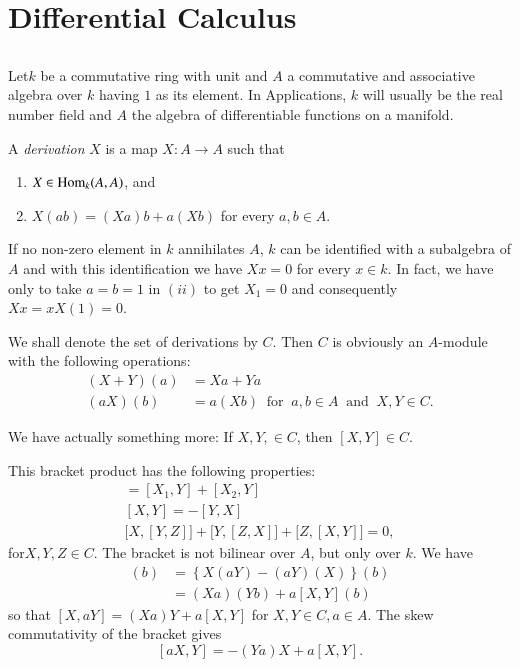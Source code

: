 \chapter{Differential Calculus}\label{chap1}

\section{}\label{chap1:sec1}%

Let\pageoriginale $k$ be a commutative ring with unit and $A$ a commutative and
associative algebra over $k$ having $1$ as its element. In
Applications, $k$ will usually be the real number field and $A$ the
algebra of differentiable functions on a manifold. 

\begin{defn}\label{chap1:sec1:def1} %
  A {\em derivation} $X$ is a map $X: A \to A$ such that 
  \begin{enumerate}[\rm i)]
  \item $X \in \operatorname{Hom}_k(A,A)$, and 
  \item $X (ab) = (Xa)b+ a(Xb)$ for every $a,b \in  A$.
  \end{enumerate}
\end{defn}

If no non-zero element in $k$ annihilates $A$, $k$ can be identified
with a subalgebra of $A$ and with this identification we have $Xx=0$
for every $x \in k$. In fact, we have only to take $a=b=1$ in $(ii)$
to get $X_1=0$ and consequently $Xx= xX(1)=0$.  

We shall denote the set of derivations by $C$. Then $C$ is obviously
an $A$-module with the following operations:  
\begin{align*}
  (X +Y) (a) &= Xa +Ya \\
  (aX) (b) & = a(Xb) ~ \text{ for } ~ a, b \in A ~ \text{ and } ~ X,Y \in C.
\end{align*}

We have actually something more: If $X,Y, \in C$, then $[X,Y] \in  C$.

This bracket product has the following properties:
\begin{gather*}
  [X_1 +X_2 , Y] = [X_1, Y] +  [X_2 , Y] \\
  [X,Y] = - [Y,X]\\
  \bigg[ X, [Y,Z] \bigg] + \bigg[Y,[Z,X] \bigg] +  \bigg[ Z, [X,Y]\bigg]
  =0, 
\end{gather*}
for\pageoriginale $X,Y,Z \in C$. The bracket is not bilinear over $A$, but only
over $k$. We have  
\begin{align*}
  [X,aY](b) & = \left\{ X (aY) - (aY) (X) \right\} (b) \\
  &= (Xa) (Yb) + a [X, Y](b)
\end{align*}
so that $[X,aY]= (Xa) Y+ a [X,Y]$ for $X,Y \in C, a \in A$. The skew
commutativity of the bracket gives 
$$
[aX,Y]=- (Ya) X +a [X,Y].
$$

